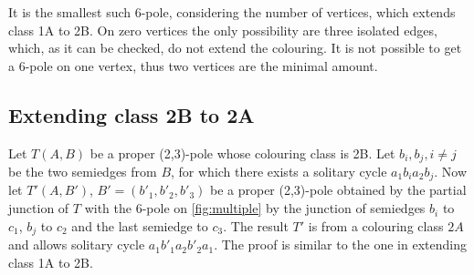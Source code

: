 %		
%		

It is the smallest such 6-pole, considering the number of vertices, which extends class 1A to 2B. On zero vertices the only possibility are three isolated edges, which, as it can be checked, do not extend the colouring. It is not possible to get a 6-pole on one vertex, thus two vertices are the minimal amount.

\subsection{Extending class 2B to 2A}

Let $T(A,B)$ be a proper (2,3)-pole whose colouring class is 2B. Let $b_i,b_j,i\neq j$ be the two semiedges from $B$, for which there exists a solitary cycle $a_1b_ia_2b_j$. Now let $T'(A,B')$, $B'=(b'_1, b'_2, b'_3)$ be a proper (2,3)-pole obtained by the partial junction of $T$ with the 6-pole on \cref{fig:multiple} by the junction of semiedges $b_i$ to $c_1$, $b_j$ to $c_2$ and the last semiedge to $c_3$. The result $T'$ is from a colouring class $2A$ and allows solitary cycle $a_1b'_1a_2b'_2a_1$. The proof is similar to the one in extending class 1A to 2B.

%	

